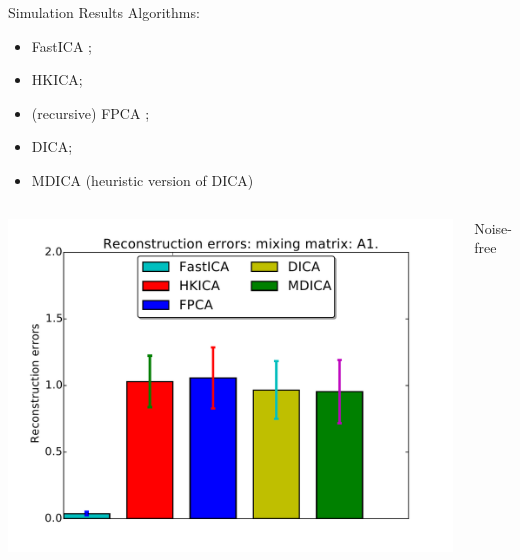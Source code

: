 \documentclass[final]{beamer} %
\newcommand{\bc}{\begin{center}}
\newcommand{\ec}{\end{center}}
\begin{document}
\begin{frame}[c]
\begin{columns}[t,totalwidth=\textwidth]
\begin{column}{0.32\textwidth}
		\vspace{0.48ex}
		\bigskip
		\bigskip
		\begin{block}{Simulation Results}
			\noindent Algorithms:
			\begin{itemize}
				\item FastICA  \citep{szabo12separation};
				\item HKICA; 
				\item (recursive) FPCA \citep{vempala2014max};
				\item DICA; 
				\item MDICA (heuristic version of DICA)
			\end{itemize}
			\vspace{0.2ex}
			\begin{columns}[t]
			\includegraphics[width=\textwidth]{barchart-A1-noisefree}
			\bc
			Noise-free
			\ec
			

\end{columns}
\end{block}
\end{column}
\end{columns}
\end{frame}
\end{document}
